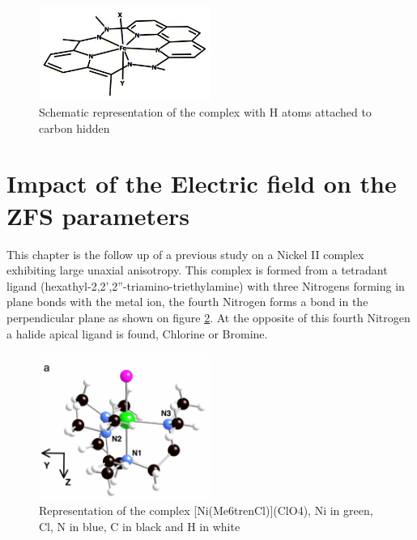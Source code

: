 \documentclass[10pt]{report}
\numberwithin{equation}{section}
\begin{document}
\begin{figure}[h!]
    \centering
    \includegraphics[width=0.5\textwidth]{Images/ComplexFe.XY.jpg}
    \caption{Schematic representation of the complex with H atoms attached to carbon hidden}
    \label{FeComplex}
\end{figure}



\section{Impact of the Electric field on the ZFS parameters}

This chapter is the follow up of a previous study on a Nickel II complex exhibiting large unaxial anisotropy.
This complex is formed from a tetradant ligand (hexathyl-2,2',2''-triamino-triethylamine) with three Nitrogens forming in plane bonds with the metal ion, the fourth Nitrogen forms a bond in the perpendicular plane as shown on figure \ref{NiMe6tren}.
At the opposite of this fourth Nitrogen a halide apical ligand is found, Chlorine or Bromine.

\begin{figure}[h!]
    \centering
    \includegraphics[width=0.5\textwidth]{Images/NiMe6trenTalal.png}
    \caption{Representation of the complex [Ni(Me6trenCl)](ClO4), Ni in green, Cl, N in blue, C in black and H in white}
    \label{NiMe6tren}
\end{figure}
\end{document}
